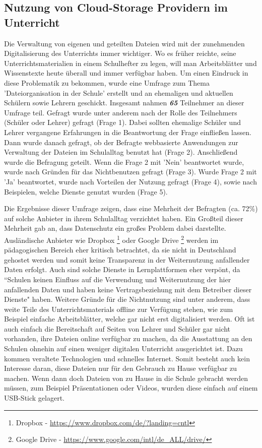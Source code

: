 \subsection{Nutzung von Cloud-Storage Providern im Unterricht}


Die Verwaltung von eigenen und geteilten Dateien wird mit der zunehmenden Digitalisierung des Unterrichts immer wichtiger. Wo es früher reichte, seine Unterrichtsmaterialien in einem Schulhefter zu legen, will man Arbeitsblätter und Wissenstexte heute überall und immer verfügbar haben. Um einen Eindruck in diese Problematik zu bekommen, wurde eine Umfrage zum Thema 'Dateiorganisation in der Schule' \cite{survey:umfragedateiorganisation} erstellt und an ehemaligen und aktuellen Schülern sowie Lehrern geschickt. Insgesamt nahmen \textbf{\textit{65}}  Teilnehmer  an dieser Umfrage teil. Gefragt wurde unter anderem nach der Rolle des Teilnehmers (Schüler oder Lehrer) gefragt (Frage 1). Dabei sollten ehemalige Schüler und Lehrer vergangene Erfahrungen in die Beantwortung der Frage einfließen lassen. Dann wurde danach gefragt, ob der Befragte webbasierte Anwendungen zur Verwaltung der Dateien im Schulalltag benutzt hat (Frage 2). Anschließend wurde die Befragung geteilt. Wenn die Frage 2 mit 'Nein' beantwortet wurde, wurde nach Gründen für das Nichtbenutzen gefragt (Frage 3). Wurde Frage 2 mit 'Ja' beantwortet, wurde nach Vorteilen der Nutzung gefragt (Frage 4), sowie nach Beispielen, welche Dienste genutzt wurden (Frage 5). 

Die Ergebnisse \cite{survey:umfragedateiorganisationergebnisse} dieser Umfrage zeigen, dass eine Mehrheit der Befragten (ca. 72\%) auf solche Anbieter in ihrem Schulalltag verzichtet haben. Ein Großteil dieser Mehrheit gab an, dass Datenschutz ein großes Problem dabei darstellte. Ausländische Anbieter wie Dropbox \footnote{Dropbox - \url{https://www.dropbox.com/de/?landing=cntl}} oder Google Drive \footnote{Google Drive - \url{https://www.google.com/intl/de_ALL/drive/}} werden im pädagogischen Bereich eher kritisch betrachtet, da sie nicht in Deutschland gehostet werden und somit keine Transparenz in der Weiternutzung anfallender Daten erfolgt. Auch sind solche Dienste in Lernplattformen eher verpönt, da ``Schulen keinen Einfluss auf die Verwendung und Weiternutzung der hier anfallenden Daten und haben keine Vertragsbeziehung mit dem Betreiber dieser Dienste" \cite{online:itslearningmythenundfakten} haben. Weitere Gründe für die Nichtnutzung sind unter anderem, dass weite Teile des Unterrichtsmaterials offline zur Verfügung stehen, wie zum Beispiel einfache Arbeitsblätter, welche gar nicht erst digitalisiert werden. Oft ist auch einfach die Bereitschaft auf Seiten von Lehrer und Schüler gar nicht vorhanden, ihre Dateien online verfügbar zu machen, da die Ausstattung an den Schulen ohnehin auf einen weniger digitalen Unterricht ausgerichtet ist. Dazu kommen veraltete Technologien und schnelles Internet. Somit besteht auch kein Interesse daran, diese Dateien nur für den Gebrauch zu Hause verfügbar zu machen. Wenn dann doch Dateien von zu Hause in die Schule gebracht werden müssen, zum Beispiel Präsentationen oder Videos, wurden diese einfach auf einem USB-Stick gelagert.

